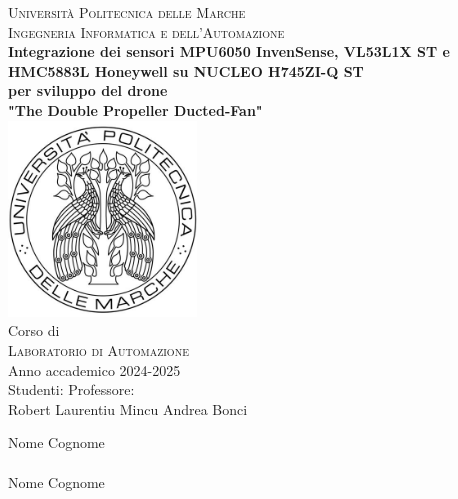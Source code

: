 \documentclass[11pt]{report}
\begin{document}


\begin{titlepage}
\begin{center}
\LARGE {\scshape{Università Politecnica delle Marche}}\\[0.5cm]
\LARGE {\scshape{Ingegneria Informatica e dell'Automazione}}\\[0.7cm]
\linespread{1}
\huge {\bfseries Integrazione dei sensori MPU6050 InvenSense, VL53L1X ST e HMC5883L Honeywell su NUCLEO H745ZI-Q ST}\\
\huge {\bfseries per sviluppo del drone}\\
\vspace{0.3cm}
\huge {\bfseries "The Double Propeller Ducted-Fan"}\\[1cm]
\linespread{1}
\includegraphics[width=5cm]{images/logoUnivpm.jpg}\\[0.5cm]
\linespread{1.2}
\Large Corso di\\
\Large {\scshape{Laboratorio di Automazione}} \\[0.3cm]
\Large {Anno accademico 2024-2025 \\[0.8cm]}
{\Large Studenti:}
\hfill {\Large Professore:}\\
{\Large Robert Laurentiu Mincu}
\hfill
{\Large Andrea Bonci}\\
\raggedright{\Large Nome Cognome\\}
\\
{\Large Nome Cognome\\[1cm]}
\end{center}
\end{titlepage}
\end{document}
